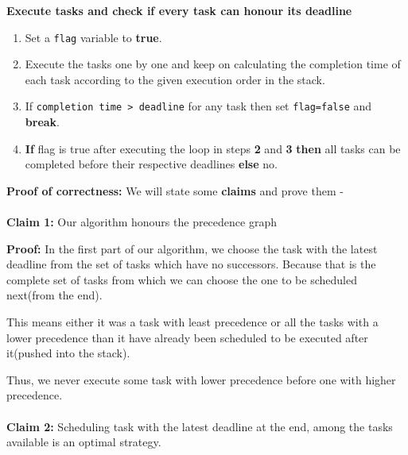 \documentclass[11pt, fleqn]{article}
\begin{document}
\textbf{Execute tasks and check if every task can honour its deadline}
\begin{enumerate}
    \item Set a \texttt{flag} variable to \textbf{true}.
    
    \item Execute the tasks one by one and keep on calculating the completion time of each task according to the given execution order in the stack.
    
    \item If \texttt{completion time > deadline} for any task then set \texttt{flag=false} and \textbf{break}.
    
    \item \textbf{If} flag is true after executing the loop in steps \textbf{2} and \textbf{3} \textbf{then} all tasks can be completed before their respective deadlines \textbf{else} no.
\end{enumerate}

\hrulefill

\textbf{Proof of correctness:} We will state some \textbf{claims} and prove them -
\paragraph{}

\textbf{Claim 1:} Our algorithm honours the precedence graph
\medskip

\textbf{Proof:} In the first part of our algorithm, we choose the task with the latest deadline from the set of tasks which have no successors. Because that is the complete set of tasks from which we can choose the one to be scheduled next(from the end).

\medskip

This means either it was a task with least precedence or all the tasks with a lower precedence than it have already been scheduled to be executed after it(pushed into the stack). 

\medskip

Thus, we never execute some task with lower precedence before one with higher precedence.

\paragraph{}

\textbf{Claim 2:} Scheduling task with the latest deadline at the end, among the tasks available is an optimal
strategy.
\end{document}
